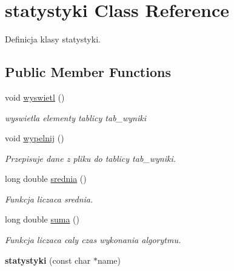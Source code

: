 \hypertarget{classstatystyki}{\section{statystyki \-Class \-Reference}
\label{classstatystyki}
}


\-Definicja klasy statystyki.  


\subsection*{\-Public \-Member \-Functions}
\begin{DoxyCompactItemize}
\item 
\hypertarget{classstatystyki_a1fb3fd3f115fcdd3e578a111017dfd7f}{void \hyperlink{classstatystyki_a1fb3fd3f115fcdd3e578a111017dfd7f}{wyswietl} ()}\label{classstatystyki_a1fb3fd3f115fcdd3e578a111017dfd7f}

\begin{DoxyCompactList}\small\item\em wyswietla elementy tablicy tab\-\_\-wyniki \end{DoxyCompactList}\item 
\hypertarget{classstatystyki_af3df6f80ce70201a4db15ce6e0b030d4}{void \hyperlink{classstatystyki_af3df6f80ce70201a4db15ce6e0b030d4}{wypelnij} ()}\label{classstatystyki_af3df6f80ce70201a4db15ce6e0b030d4}

\begin{DoxyCompactList}\small\item\em \-Przepisuje dane z pliku do tablicy tab\-\_\-wyniki. \end{DoxyCompactList}\item 
\hypertarget{classstatystyki_aed4152d38f1d67830151b89ca50efaa5}{long double \hyperlink{classstatystyki_aed4152d38f1d67830151b89ca50efaa5}{srednia} ()}\label{classstatystyki_aed4152d38f1d67830151b89ca50efaa5}

\begin{DoxyCompactList}\small\item\em \-Funkcja liczaca srednia. \end{DoxyCompactList}\item 
\hypertarget{classstatystyki_a8383729169cb6031d9f919c402ebb84c}{long double \hyperlink{classstatystyki_a8383729169cb6031d9f919c402ebb84c}{suma} ()}\label{classstatystyki_a8383729169cb6031d9f919c402ebb84c}

\begin{DoxyCompactList}\small\item\em \-Funkcja liczaca caly czas wykonania algorytmu. \end{DoxyCompactList}\item 
\hypertarget{classstatystyki_a5d6e057a25559f28bed85a34ccc78fec}{{\bfseries statystyki} (const char $\ast$name)}\label{classstatystyki_a5d6e057a25559f28bed85a34ccc78fec}

\end{DoxyCompactItemize}
